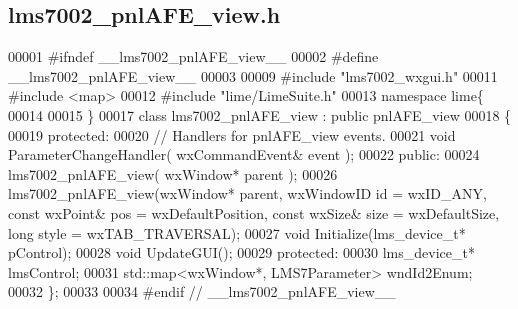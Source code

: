 \subsection{lms7002\+\_\+pnl\+A\+F\+E\+\_\+view.\+h}
\label{lms7002__pnlAFE__view_8h_source}

\begin{DoxyCode}
00001 \textcolor{preprocessor}{#ifndef \_\_lms7002\_pnlAFE\_view\_\_}
00002 \textcolor{preprocessor}{#define \_\_lms7002\_pnlAFE\_view\_\_}
00003 
00009 \textcolor{preprocessor}{#include "lms7002_wxgui.h"}
00011 \textcolor{preprocessor}{#include <map>}
00012 \textcolor{preprocessor}{#include "lime/LimeSuite.h"}
00013 \textcolor{keyword}{namespace }lime\{
00014 
00015 \}
00017 \textcolor{keyword}{class }lms7002_pnlAFE_view : \textcolor{keyword}{public} pnlAFE_view
00018 \{
00019     \textcolor{keyword}{protected}:
00020         \textcolor{comment}{// Handlers for pnlAFE\_view events.}
00021         \textcolor{keywordtype}{void} ParameterChangeHandler( wxCommandEvent& event );
00022     \textcolor{keyword}{public}:
00024         lms7002_pnlAFE_view( wxWindow* parent );
00026     lms7002_pnlAFE_view(wxWindow* parent, wxWindowID \textcolor{keywordtype}{id} = wxID\_ANY, \textcolor{keyword}{const} wxPoint& pos = wxDefaultPosition,
       \textcolor{keyword}{const} wxSize& size = wxDefaultSize, \textcolor{keywordtype}{long} style = wxTAB\_TRAVERSAL);
00027     \textcolor{keywordtype}{void} Initialize(lms_device_t* pControl);
00028     \textcolor{keywordtype}{void} UpdateGUI();
00029 \textcolor{keyword}{protected}:
00030     lms_device_t* lmsControl;
00031     std::map<wxWindow*, LMS7Parameter> wndId2Enum;
00032 \};
00033 
00034 \textcolor{preprocessor}{#endif // \_\_lms7002\_pnlAFE\_view\_\_}
\end{DoxyCode}
